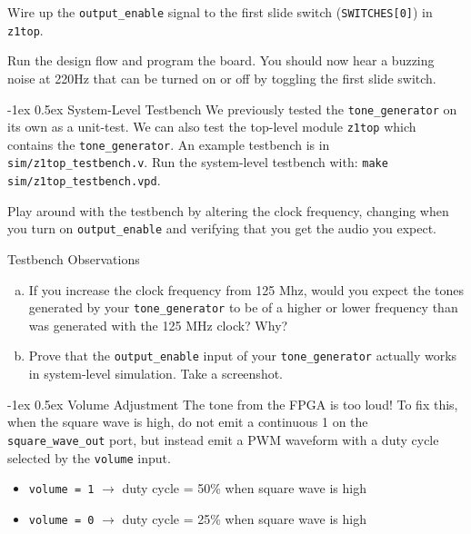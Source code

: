 \documentclass[11pt]{article}
\makeatletter
\renewcommand{\subsection}
{\@startsection {subsection}{1}{0pt}
 {-1ex}
 {0.5ex}
 {\bfseries\normalsize}}
\makeatother
\begin{document}
Wire up the \verb|output_enable| signal to the first slide switch (\verb|SWITCHES[0]|) in \verb|z1top|.

Run the design flow and program the board. You should now hear a buzzing noise at 220Hz that can be turned on or off by toggling the first slide switch.

\subsection{System-Level Testbench}
We previously tested the \verb|tone_generator| on its own as a unit-test.
We can also test the top-level module \verb|z1top| which contains the \verb|tone_generator|.
An example testbench is in \verb|sim/z1top_testbench.v|.
Run the system-level testbench with: \verb|make sim/z1top_testbench.vpd|.

Play around with the testbench by altering the clock frequency, changing when you turn on \verb|output_enable| and verifying that you get the audio you expect.

\begin{texexptitled}{Testbench Observations}{}
  \begin{enumerate}[a)]
    \item If you increase the clock frequency from 125 Mhz, would you expect the tones generated by your \verb|tone_generator| to be of a higher or lower frequency than was generated with the 125 MHz clock? Why?
    \item Prove that the \verb|output_enable| input of your \verb|tone_generator| actually works in system-level simulation. Take a screenshot.
  \end{enumerate}
\end{texexptitled}

\subsection{Volume Adjustment}
The tone from the FPGA is too loud!
To fix this, when the square wave is high, do not emit a continuous 1 on the \verb|square_wave_out| port, but instead emit a PWM waveform with a duty cycle selected by the \verb|volume| input.
\begin{itemize}
  \item \verb|volume = 1| $\rightarrow$ duty cycle = 50\% when square wave is high
  \item \verb|volume = 0| $\rightarrow$ duty cycle = 25\% when square wave is high
\end{itemize}
\end{document}
